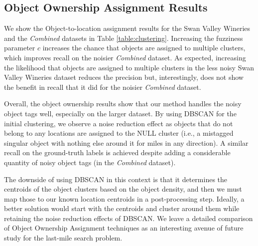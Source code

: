 \subsection{Object Ownership Assignment Results}
We show the Object-to-location assignment results for the Swan Valley Wineries and the \textit{Combined} datasets in Table \ref{table:clustering}. 
Increasing the fuzziness parameter $c$ increases the chance that objects are assigned to multiple clusters, which improves recall on the noisier \textit{Combined} dataset.
As expected, increasing the likelihood that objects are assigned to multiple clusters in the less noisy Swan Valley Wineries dataset reduces the precision but, interestingly, does not show the benefit in recall that it did for the noisier \textit{Combined} dataset.

Overall, the object ownership results show that our method handles the noisy object tags well, especially on the larger dataset. By using DBSCAN for the initial clustering, we observe a noise reduction effect as objects that do not belong to any locations are assigned to the NULL cluster (i.e., a mistagged singular object with nothing else around it for miles in any direction). A similar recall on the ground-truth labels is achieved despite adding a considerable quantity of noisy object tags (in the \textit{Combined} dataset). 

The downside of using DBSCAN in this context is that it determines the centroids of the object clusters based on the object density, and then we must map those to our known location centroids in a post-processing step. 
Ideally, a better solution would start with the centroids and cluster around them while retaining the noise reduction effects of DBSCAN.
We leave a detailed comparison of Object Ownership Assignment techniques as an interesting avenue of future study for the last-mile search problem.


